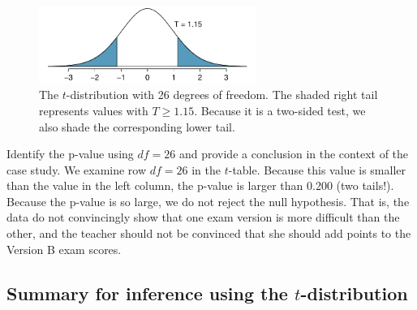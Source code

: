 {\begin{figure}[h]
\centering
\includegraphics[width=0.63\textwidth]{ch_inference_for_means/figures/pValueOfTwoTailAreaOfExamVersionsWhereDFIs26/pValueOfTwoTailAreaOfExamVersionsWhereDFIs26}
\caption{The $t$-distribution with 26 degrees of freedom. The shaded right tail represents values with $T \geq 1.15$. Because it is a two-sided test, we also shade the corresponding lower tail.}
\label{pValueOfTwoTailAreaOfExamVersionsWhereDFIs26}
\end{figure}

\begin{example}{Identify the p-value using $df = 26$ and provide a conclusion in the context of the case study.}
We examine row $df=26$ in the $t$-table. Because this value is smaller than the value in the left column, the p-value is larger than 0.200 (two tails!). Because the p-value is so large, we do not reject the null hypothesis. That is, the data do not convincingly show that one exam version is more difficult than the other, and the teacher should not be convinced that she should add points to the Version B exam scores.

\end{example}


\subsection{Summary for inference using the $t$-distribution}


}
